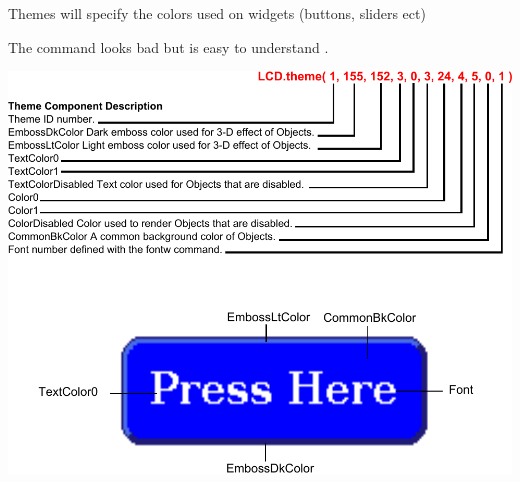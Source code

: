 Themes will specify the colors used on widgets (buttons, sliders ect)\par
 The command looks bad but is easy to understand .\par
  
\begin{DoxyImageNoCaption}
  \mbox{\includegraphics{themes}}
\end{DoxyImageNoCaption}
 